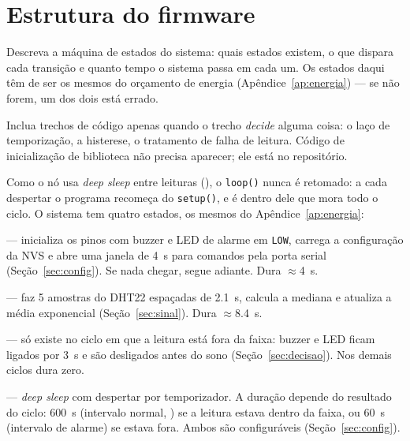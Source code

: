 \section{Estrutura do firmware}
\label{sec:firmware}

\begin{orientacao}
Descreva a máquina de estados do sistema: quais estados existem, o que
dispara cada transição e quanto tempo o sistema passa em cada um. Os
estados daqui têm de ser os mesmos do orçamento de energia
(Apêndice~\ref{ap:energia}) --- se não forem, um dos dois está errado.

Inclua trechos de código apenas quando o trecho \emph{decide} alguma
coisa: o laço de temporização, a histerese, o tratamento de falha de
leitura. Código de inicialização de biblioteca não precisa aparecer;
ele está no repositório.
\end{orientacao}

Como o nó usa \emph{deep sleep} entre leituras (), o
\texttt{loop()} nunca é retomado: a cada despertar o programa recomeça
do \texttt{setup()}, e é dentro dele que mora todo o ciclo. O sistema
tem quatro estados, os mesmos do Apêndice~\ref{ap:energia}:

\begin{description}[style=unboxed, leftmargin=0.6cm]
  \item[\textsc{acorda e configura}] --- inicializa os pinos com buzzer
    e LED de alarme em \texttt{LOW}, carrega a configuração da NVS e
    abre uma janela de \SI{4}{\second} para comandos pela porta serial
    (Seção~\ref{sec:config}). Se nada chegar, segue adiante. Dura
    $\approx$\SI{4}{\second}.
  \item[\textsc{lê}] --- faz 5 amostras do DHT22 espaçadas de
    \SI{2.1}{\second}, calcula a mediana e atualiza a média exponencial
    (Seção~\ref{sec:sinal}). Dura $\approx$\SI{8,4}{\second}.
  \item[\textsc{aciona o atuador}] --- só existe no ciclo em que a
    leitura está fora da faixa: buzzer e LED ficam ligados por
    \SI{3}{\second} e são desligados antes do sono
    (Seção~\ref{sec:decisao}). Nos demais ciclos dura zero.
  \item[\textsc{dorme}] --- \emph{deep sleep} com despertar por
    temporizador. A duração depende do resultado do ciclo:
    \SI{600}{\second} (intervalo normal, ) se a leitura estava
    dentro da faixa, ou \SI{60}{\second} (intervalo de alarme) se
    estava fora. Ambos são configuráveis (Seção~\ref{sec:config}).
\end{description}

